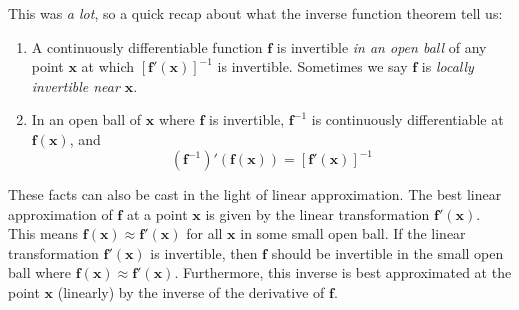 \documentclass{article}
\newcommand{\x}{\mathbf{x}}
\newcommand{\f}{\mathbf{f}}
\theoremstyle{definition}
\begin{document}
	This was \textit{a lot}, so a quick recap about what the inverse function theorem  tell us:
	\begin{enumerate}
		\item A continuously differentiable function $ \f $ is invertible \textit{in an open ball} of any point $ \x $ at which $ [\f'(\x)]^{-1} $ is invertible. Sometimes we say $ \f $ is \textit{\color{red}locally invertible near $ \x $}. 
		\item In an open ball of $ \x $ where $ \f $ is invertible, $ \f^{-1} $ is continuously differentiable at $ \f(\x) $, and 
		$$ (\f^{-1})'(\f(\x)) = [\f'(\x)]^{-1}$$
	\end{enumerate}
	These facts can also be cast in the light of linear approximation. The best linear approximation of $ \f $ at a point $ \x $ is given by the linear transformation $ \f'(\x) $. This means $ \f(\x) \approx \f'(\x) $ for all $ \x $ in some small open ball. If the linear transformation $ \f'(\x) $ is invertible, then $ \f $ should be invertible in the small open ball where $ \f(\x) \approx \f'(\x) $. Furthermore, this inverse is best approximated at the point $ \x $ (linearly) by the inverse of the derivative of $ \f $. 
\end{document}
